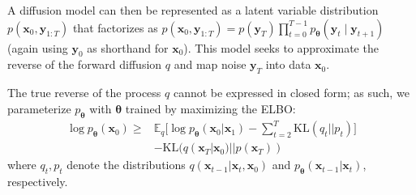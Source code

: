 \documentclass[letterpaper]{article} %
\newcommand{\bx}{\mathbf{x}}
\newcommand{\bz}{\mathbf{z}}
\newcommand{\by}{\mathbf{y}}
\newcommand\Exp{\mathbb{E}}
\newcommand\KL{\text{KL}}
\newcommand{\Top}[1]{\textbf{\textcolor{magenta}{Top: #1}} }
\let\oldtheta\theta
\renewcommand{\theta}{{\boldsymbol \oldtheta}}
\begin{document}
A diffusion model can then be represented as a latent variable distribution $p(\bx_{0}, \by_{1:T})$ %
that factorizes as
$p(\bx_0, \by_{1:T}) = p(\by_{T}) \prod_{t=0}^{T-1} p_\theta(\by_t \mid \by_{t+1})$ (again using $\by_0$ as shorthand for $\bx_0$).
This model seeks to approximate the reverse of the forward diffusion $q$ and map noise $\by_T$ into data $\bx_0$.

The true reverse of the process $q$ cannot be expressed in closed form; as such, we parameterize $p_\theta$ with $\theta$
trained by maximizing the ELBO:
\vspace{-5pt}
\begin{align}
    \log p_\theta(\bx_{0}) \geq &
    \Exp_{q} \Bigr[\log p_\theta(\bx_{0} | \bx_{1})  -  \sum_{t=2}^T  \KL(q_t || p_t) \Bigr] \\ \nonumber
    &- \KL(q(\bx_T | \bx_{0}) || p(\bx_T))
\end{align}
where $q_t, p_t$ denote the distributions $q(\bx_{t-1} | \bx_{t}, \bx_0)$ and $p_\theta(\bx_{t-1} | \bx_{t})$, respectively.


\end{document}
